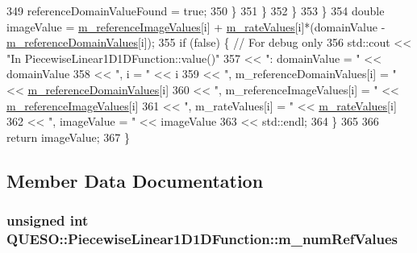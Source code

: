 \begin{DoxyCode}
349           referenceDomainValueFound = \textcolor{keyword}{true};
350         \}
351       \}
352     \}
353   \}
354   \textcolor{keywordtype}{double} imageValue = \hyperlink{class_q_u_e_s_o_1_1_piecewise_linear1_d1_d_function_a83a27b74cb337be9d5b3e2b91d8ab6ad}{m\_referenceImageValues}[i] + 
      \hyperlink{class_q_u_e_s_o_1_1_piecewise_linear1_d1_d_function_aef7d37fe499c0e8f3bb6261f1b4e8147}{m\_rateValues}[i]*(domainValue - \hyperlink{class_q_u_e_s_o_1_1_piecewise_linear1_d1_d_function_abda9e4143096bf0bf935b7c9173aa2cc}{m\_referenceDomainValues}[i]);
355   \textcolor{keywordflow}{if} (\textcolor{keyword}{false}) \{ \textcolor{comment}{// For debug only}
356     std::cout << \textcolor{stringliteral}{"In PiecewiseLinear1D1DFunction::value()"}
357               << \textcolor{stringliteral}{": domainValue = "}                << domainValue
358               << \textcolor{stringliteral}{", i = "}                          << i
359               << \textcolor{stringliteral}{", m\_referenceDomainValues[i] = "} << \hyperlink{class_q_u_e_s_o_1_1_piecewise_linear1_d1_d_function_abda9e4143096bf0bf935b7c9173aa2cc}{m\_referenceDomainValues}[i]
360               << \textcolor{stringliteral}{", m\_referenceImageValues[i] = "}  << \hyperlink{class_q_u_e_s_o_1_1_piecewise_linear1_d1_d_function_a83a27b74cb337be9d5b3e2b91d8ab6ad}{m\_referenceImageValues}[i]
361               << \textcolor{stringliteral}{", m\_rateValues[i] = "}            << \hyperlink{class_q_u_e_s_o_1_1_piecewise_linear1_d1_d_function_aef7d37fe499c0e8f3bb6261f1b4e8147}{m\_rateValues}[i]
362               << \textcolor{stringliteral}{", imageValue = "}                 << imageValue
363               << std::endl;
364   \}
365 
366   \textcolor{keywordflow}{return} imageValue;
367 \}
\end{DoxyCode}


\subsection{Member Data Documentation}
\hypertarget{class_q_u_e_s_o_1_1_piecewise_linear1_d1_d_function_a1ff5c7e5243f6a763409a68e86681129}{
\subsubsection[{m\-\_\-num\-Ref\-Values}]{\setlength{\rightskip}{0pt plus 5cm}unsigned int Q\-U\-E\-S\-O\-::\-Piecewise\-Linear1\-D1\-D\-Function\-::m\-\_\-num\-Ref\-Values\hspace{0.3cm}{\ttfamily [protected]}}}\label{class_q_u_e_s_o_1_1_piecewise_linear1_d1_d_function_a1ff5c7e5243f6a763409a68e86681129}


